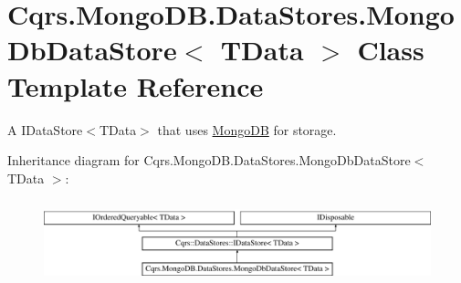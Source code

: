 \hypertarget{classCqrs_1_1MongoDB_1_1DataStores_1_1MongoDbDataStore}{}\section{Cqrs.\+Mongo\+D\+B.\+Data\+Stores.\+Mongo\+Db\+Data\+Store$<$ T\+Data $>$ Class Template Reference}
\label{classCqrs_1_1MongoDB_1_1DataStores_1_1MongoDbDataStore}


A I\+Data\+Store$<$\+T\+Data$>$ that uses \hyperlink{namespaceCqrs_1_1MongoDB}{Mongo\+DB} for storage.  


Inheritance diagram for Cqrs.\+Mongo\+D\+B.\+Data\+Stores.\+Mongo\+Db\+Data\+Store$<$ T\+Data $>$\+:\begin{figure}[H]
\begin{center}
\leavevmode
\includegraphics[height=2.441860cm]{classCqrs_1_1MongoDB_1_1DataStores_1_1MongoDbDataStore}
\end{center}
\end{figure}

